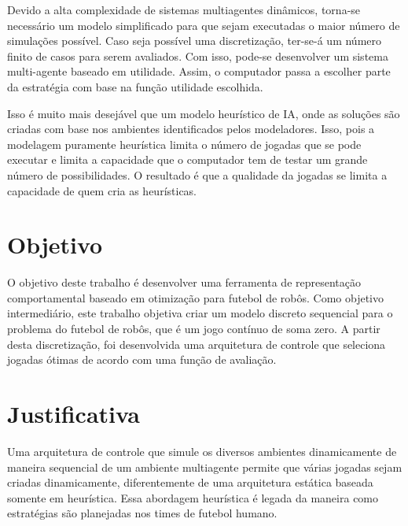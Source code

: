 Devido a alta complexidade de sistemas multiagentes dinâmicos, torna-se
necessário um modelo simplificado para que sejam executadas o maior número de
simulações possível.  Caso seja possível uma discretização, ter-se-á um número
finito de casos para serem avaliados. Com isso, pode-se desenvolver um sistema
multi-agente baseado em utilidade. Assim, o computador passa a escolher parte
da estratégia com base na função utilidade escolhida.

Isso é muito mais desejável que um modelo heurístico de IA, onde as soluções são
criadas com base nos ambientes identificados pelos modeladores. Isso, pois a
modelagem puramente heurística limita o número de jogadas que se pode executar e
limita a capacidade que o computador tem de testar um grande número de possibilidades.
O resultado é que a qualidade da jogadas se limita a capacidade de quem cria as
heurísticas.

\section{Objetivo}

O objetivo deste trabalho é desenvolver uma ferramenta de representação
comportamental baseado em otimização para futebol de robôs.
Como objetivo intermediário, este trabalho objetiva criar um modelo discreto
sequencial para o problema do futebol de robôs, que é um jogo contínuo de soma
zero.  A partir desta discretização, foi desenvolvida uma arquitetura de
controle que seleciona jogadas ótimas de acordo com uma função de avaliação.

\section{Justificativa}

Uma arquitetura de controle que simule os diversos ambientes dinamicamente de
maneira sequencial de um ambiente multiagente permite que várias jogadas sejam
criadas dinamicamente, diferentemente de uma arquitetura estática baseada somente
em heurística. Essa abordagem heurística é legada da maneira como estratégias
são planejadas nos times de futebol humano.


